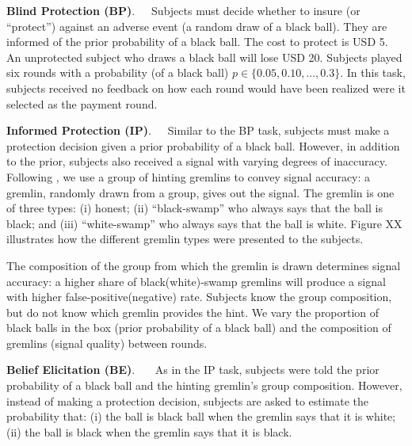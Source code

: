 \documentclass[12pt,a4paper]{article}
\begin{document}
\bigskip
\noindent\textbf{Blind Protection (BP)}.\ \ \ Subjects must decide whether to insure (or “protect”) against an adverse event (a random draw of a black ball).  They are informed of the prior probability of a black ball. The cost to protect is USD 5. An unprotected subject who draws a black ball will lose USD 20. Subjects played six rounds with a probability (of a black ball) $p \in \{0.05,0.10,...,0.3\}$. In this task, subjects received no feedback on how each round would have been realized were it selected as the payment round.

\bigskip
\noindent\textbf{Informed Protection (IP)}.\ \ \ Similar to the BP task, subjects must make a protection decision given a prior probability of a black ball. However, in addition to the prior, subjects also received a signal with varying degrees of inaccuracy. Following \citet{coutts_good_2019}, we use a group of hinting gremlins to convey signal accuracy: a gremlin, randomly drawn from a group, gives out the signal. The gremlin is one of three types: (i) honest; (ii) ``black-swamp'' who always says that the ball is black; and (iii) ``white-swamp'' who always says that the ball is white. Figure XX illustrates how the different gremlin types were presented to the subjects. 

The composition of the group from which the gremlin is drawn determines signal accuracy: a higher share of black(white)-swamp gremlins will produce a signal with higher false-positive(negative) rate. Subjects know the group composition, but do not know which gremlin provides the hint. We vary the proportion of black balls in the box (prior probability of a black ball) and the composition of gremlins (signal quality) between rounds.  

\bigskip
\noindent\textbf{Belief Elicitation (BE)}.\ \ \ 
As in the IP task, subjects were told the prior probability of a black ball and the hinting gremlin's group composition. However, instead of making a protection decision, subjects are asked to estimate the probability that: (i) the ball is black ball when the gremlin says that it is white; (ii) the ball is black when the gremlin says that it is black. 
\end{document}
